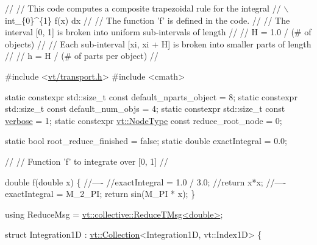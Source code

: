 \begin{DoxyCodeInclude}

\textcolor{comment}{//}
\textcolor{comment}{// This code computes a composite trapezoidal rule for the integral}
\textcolor{comment}{// \(\backslash\)int\_\{0\}^\{1\} f(x) dx}
\textcolor{comment}{//}
\textcolor{comment}{// The function 'f' is defined in the code.}
\textcolor{comment}{//}
\textcolor{comment}{// The interval [0, 1] is broken into uniform sub-intervals of length}
\textcolor{comment}{//}
\textcolor{comment}{// H = 1.0 / (# of objects)}
\textcolor{comment}{//}
\textcolor{comment}{// Each sub-interval [xi, xi + H] is broken into smaller parts of length}
\textcolor{comment}{//}
\textcolor{comment}{// h = H / (# of parts per object)}
\textcolor{comment}{//}


\textcolor{preprocessor}{#include <\hyperlink{transport_8h}{vt/transport.h}>}
\textcolor{preprocessor}{#include <cmath>}

\textcolor{keyword}{static} constexpr std::size\_t \textcolor{keyword}{const} default\_nparts\_object = 8;
\textcolor{keyword}{static} constexpr std::size\_t \textcolor{keyword}{const} default\_num\_objs = 4;
\textcolor{keyword}{static} constexpr std::size\_t \textcolor{keyword}{const} \hyperlink{namespacevt_1_1config_a724e99568632cc0fe9c456c2230270d0a9b54bf70f7b7fe7cfb6f3da0e167ae27}{verbose} = 1;
\textcolor{keyword}{static} constexpr \hyperlink{namespacevt_a866da9d0efc19c0a1ce79e9e492f47e2}{vt::NodeType} \textcolor{keyword}{const} reduce\_root\_node = 0;

\textcolor{keyword}{static} \textcolor{keywordtype}{bool} root\_reduce\_finished = \textcolor{keyword}{false};
\textcolor{keyword}{static} \textcolor{keywordtype}{double} exactIntegral = 0.0;


\textcolor{comment}{//}
\textcolor{comment}{// Function 'f' to integrate over [0, 1]}
\textcolor{comment}{//}


\textcolor{keywordtype}{double} f(\textcolor{keywordtype}{double} x) \{
  \textcolor{comment}{//----}
  \textcolor{comment}{//exactIntegral = 1.0 / 3.0;}
  \textcolor{comment}{//return x*x;}
  \textcolor{comment}{//----}
  exactIntegral = M\_2\_PI;
  \textcolor{keywordflow}{return} sin(M\_PI * x);
\}

\textcolor{keyword}{using} ReduceMsg = \hyperlink{structvt_1_1collective_1_1reduce_1_1operators_1_1_reduce_t_msg}{vt::collective::ReduceTMsg<double>};

\textcolor{keyword}{struct }Integration1D : \hyperlink{structvt_1_1vrt_1_1collection_1_1_collection}{vt::Collection}<Integration1D, vt::Index1D> \{


\end{DoxyCodeInclude}
